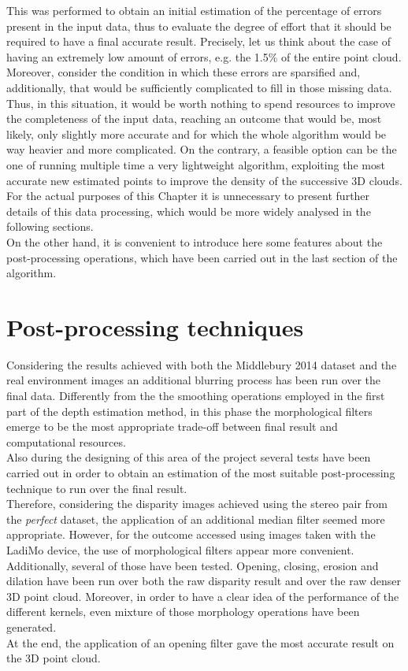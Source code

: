 This was performed to obtain an initial estimation of the percentage of errors present in the input data, thus to evaluate the degree of effort that it should be required to have a final accurate result.
Precisely, let us think about the case of having an extremely low amount of errors, e.g. the 1.5\% of the entire point cloud. 
Moreover, consider the condition in which these errors are sparsified and, additionally, that would be sufficiently complicated to fill in those missing data.
Thus, in this situation, it would be worth nothing to spend resources to improve the completeness of the input data, reaching an outcome that would be, most likely, only slightly more accurate and for which the whole algorithm would be way heavier and more complicated. 
On the contrary, a feasible option can be the one of running multiple time a very lightweight algorithm, exploiting the most accurate new estimated points to improve the density of the successive 3D clouds.\\
For the actual purposes of this Chapter it is unnecessary to present further details of this data processing, which would be more widely analysed in the following sections. \\
On the other hand, it is convenient to introduce here some features about the post-processing operations, which have been carried out in the last section of the algorithm.\\

\section{Post-processing techniques}
\label{section:post-process-tech}

Considering the results achieved with both the Middlebury 2014 dataset and the real environment images an additional blurring process has been run over the final data. 
Differently from the the smoothing operations employed in the first part of the depth estimation method, in this phase the morphological filters emerge to be the most appropriate trade-off between final result and computational resources. \\
Also during the designing of this area of the project several tests have been carried out in order to obtain an estimation of the most suitable post-processing technique to run over the final result.\\
Therefore, considering the disparity images achieved using the stereo pair from the \textit{perfect} dataset, the application of an additional median filter seemed more appropriate.
However, for the outcome accessed using images taken with the LadiMo device, the use of morphological filters appear more convenient. 
Additionally, several of those have been tested. 
Opening, closing, erosion and dilation have been run over both the raw disparity result and over the raw denser 3D point cloud.
Moreover, in order to have a clear idea of the performance of the different kernels, even mixture of those morphology operations have been generated. \\
At the end, the application of an opening filter gave the most accurate result on the 3D point cloud. 
